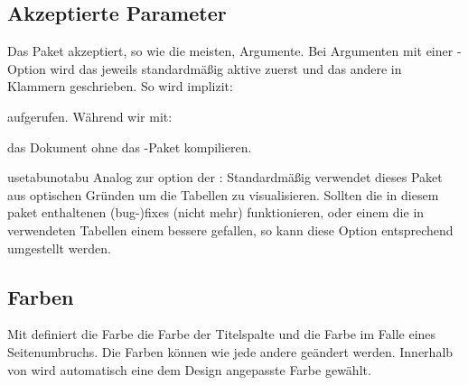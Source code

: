 \documentclass{sopra-base}
\begin{document}
\subsection{Akzeptierte Parameter}
    Das Paket akzeptiert, so wie die meisten, Argumente. 
    Bei Argumenten mit einer -Option wird das jeweils standardmäßig aktive zuerst und das andere in Klammern
    geschrieben. So wird implizit:
\begin{plainlatex}
    \usepackage[usetabu]{sopra-tables}
\end{plainlatex}
    aufgerufen. Während wir mit:
\begin{plainlatex}
    \usepackage[notabu]{sopra-tables}
\end{plainlatex}
    das Dokument ohne das -Paket kompilieren.

    \begin{argument}{usetabu}{notabu}
        Analog zur  option der : Standardmäßig verwendet dieses Paket aus optischen Gründen  um die Tabellen zu visualisieren. Sollten die in diesem paket enthaltenen (bug-)fixes (nicht mehr) funktionieren, oder einem die in  verwendeten  Tabellen einem bessere gefallen, so kann diese Option entsprechend umgestellt werden.  
    \end{argument}


    \subsection{Farben}

    Mit  definiert die Farbe  die Farbe der Titelspalte und  die Farbe im Falle eines Seitenumbruchs. Die Farben können wie jede andere geändert werden. Innerhalb von  wird automatisch eine dem Design angepasste Farbe gewählt.

%
%
%
%
\end{document}
